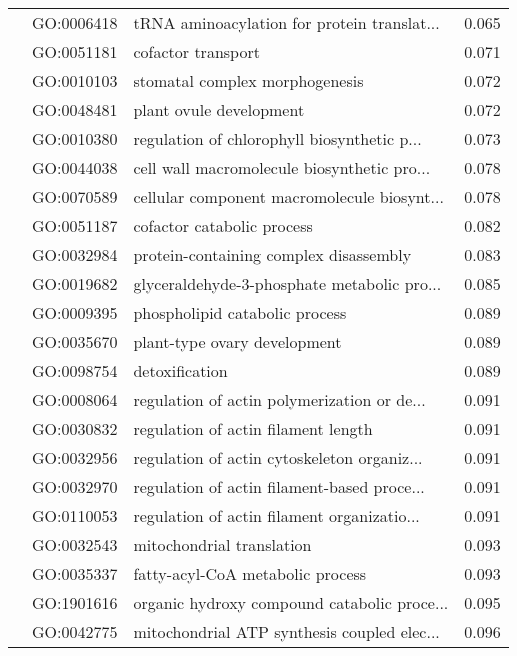 \begin{longtable}{lllr}
   & GO:0006418 &  tRNA aminoacylation for protein translat... &         0.065 \\
   & GO:0051181 &                           cofactor transport &         0.071 \\
   & GO:0010103 &               stomatal complex morphogenesis &         0.072 \\
   & GO:0048481 &                      plant ovule development &         0.072 \\
   & GO:0010380 &  regulation of chlorophyll biosynthetic p... &         0.073 \\
   & GO:0044038 &  cell wall macromolecule biosynthetic pro... &         0.078 \\
   & GO:0070589 &  cellular component macromolecule biosynt... &         0.078 \\
   & GO:0051187 &                   cofactor catabolic process &         0.082 \\
   & GO:0032984 &       protein-containing complex disassembly &         0.083 \\
   & GO:0019682 &  glyceraldehyde-3-phosphate metabolic pro... &         0.085 \\
   & GO:0009395 &               phospholipid catabolic process &         0.089 \\
   & GO:0035670 &                 plant-type ovary development &         0.089 \\
   & GO:0098754 &                               detoxification &         0.089 \\
   & GO:0008064 &  regulation of actin polymerization or de... &         0.091 \\
   & GO:0030832 &          regulation of actin filament length &         0.091 \\
   & GO:0032956 &  regulation of actin cytoskeleton organiz... &         0.091 \\
   & GO:0032970 &  regulation of actin filament-based proce... &         0.091 \\
   & GO:0110053 &  regulation of actin filament organizatio... &         0.091 \\
   & GO:0032543 &                    mitochondrial translation &         0.093 \\
   & GO:0035337 &             fatty-acyl-CoA metabolic process &         0.093 \\
   & GO:1901616 &  organic hydroxy compound catabolic proce... &         0.095 \\
   & GO:0042775 &  mitochondrial ATP synthesis coupled elec... &         0.096 \\

\end{longtable}
